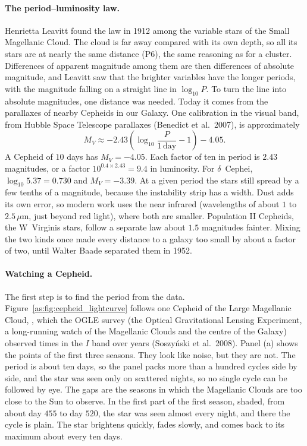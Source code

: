 \paragraph{The period--luminosity law.} Henrietta Leavitt found the law in 1912 among the variable stars of the Small Magellanic Cloud. The cloud is far away compared with its own depth, so all its stars are at nearly the same distance (P6), the same reasoning as for a cluster. Differences of apparent magnitude among them are then differences of absolute magnitude, and Leavitt saw that the brighter variables have the longer periods, with the magnitude falling on a straight line in $\log_{10}P$. To turn the line into absolute magnitudes, one distance was needed. Today it comes from the parallaxes of nearby Cepheids in our Galaxy. One calibration in the visual band, from Hubble Space Telescope parallaxes (Benedict et al.\ 2007), is approximately
\begin{equation}
	\boxed{M_V \approx -2.43\left(\log_{10}\frac{P}{1\,\mathrm{day}}-1\right)-4.05 .}
	\label{as:eq:pl}
\end{equation}
A Cepheid of $10$ days has $M_V=-4.05$. Each factor of ten in period is $2.43$ magnitudes, or a factor $10^{0.4\times2.43}=9.4$ in luminosity. For $\delta$~Cephei, $\log_{10}5.37=0.730$ and $M_V=-3.39$. At a given period the stars still spread by a few tenths of a magnitude, because the instability strip has a width. Dust adds its own error, so modern work uses the near infrared (wavelengths of about $1$ to $2.5\,\mu\mathrm m$, just beyond red light), where both are smaller. Population II Cepheids, the W~Virginis stars, follow a separate law about $1.5$ magnitudes fainter. Mixing the two kinds once made every distance to a galaxy too small by about a factor of two, until Walter Baade separated them in 1952.


\paragraph{Watching a Cepheid.} The first step is to find the period from the data. Figure~\ref{as:fig:cepheid_lightcurve} follows one Cepheid of the Large Magellanic Cloud, \ThreeCepName, which the OGLE survey (the Optical Gravitational Lensing Experiment, a long-running watch of the Magellanic Clouds and the centre of the Galaxy) observed \ThreeCepNpoints{} times in the $I$ band over \ThreeCepSpan{} years (Soszy\'nski et al.\ 2008). Panel (a) shows the points of the first three seasons. They look like noise, but they are not. The period is about ten days, so the panel packs more than a hundred cycles side by side, and the star was seen only on scattered nights, so no single cycle can be followed by eye. The gaps are the seasons in which the Magellanic Clouds are too close to the Sun to observe. In the first part of the first season, shaded, from about day $455$ to day $520$, the star was seen almost every night, and there the cycle is plain. The star brightens quickly, fades slowly, and comes back to its maximum about every ten days.

